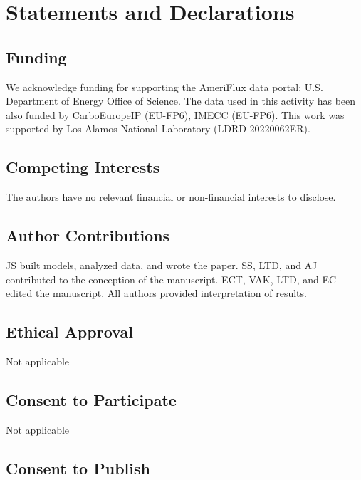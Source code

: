 \documentclass{article}
\begin{document}




\section*{Statements and Declarations}

\subsection*{Funding}

We acknowledge funding for supporting the AmeriFlux data portal: U.S. Department of Energy Office of Science. The data used in this activity has been also funded by CarboEuropeIP (EU-FP6), IMECC (EU-FP6). This work was supported by Los Alamos National Laboratory (LDRD-20220062ER).

\subsection*{Competing Interests}

The authors have no relevant financial or non-financial interests to disclose.

\subsection*{Author Contributions}

JS built models, analyzed data, and wrote the paper. SS, LTD, and AJ contributed to the conception of the manuscript. ECT, VAK, LTD, and EC edited the manuscript. All authors provided interpretation of results.

\subsection*{Ethical Approval}

Not applicable

\subsection*{Consent to Participate}

Not applicable

\subsection*{Consent to Publish}
\end{document}
